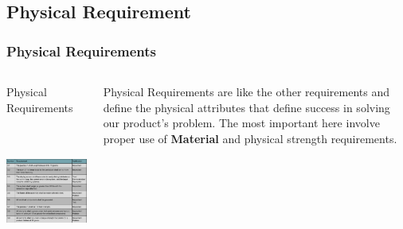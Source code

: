 \documentclass[aspectratio=169]{beamer}
\begin{document}
\subsection{Physical Requirement}
\begin{frame}
    \frametitle{Physical Requirements}

    \begin{columns}
        \begin{column}{0.48\textwidth}
            \begin{block}{Physical Requirements}
                \includegraphics[height=5cm]{PhysicalRequirement}
            \end{block}
        \end{column}

        \begin{column}{0.48\textwidth}
            Physical Requirements are like the other requirements and define the physical
            attributes that define success in solving our product's problem. The most important here
            involve proper use of \textbf{Material} and physical strength requirements.
        \end{column}
    \end{columns}


\end{frame}
\end{document}
